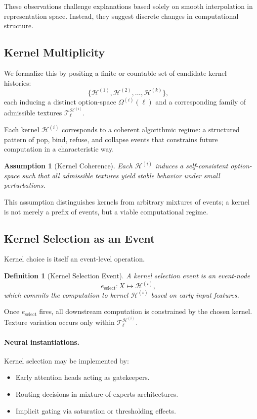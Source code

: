 \documentclass[11pt]{article}
\newtheorem{definition}{Definition}
\newtheorem{assumption}{Assumption}
\theoremstyle{remark}
\newcommand{\Hist}{\mathcal{H}}
\begin{document}
These observations challenge explanations based solely on smooth
interpolation in representation space. Instead, they suggest discrete
changes in computational structure.

\subsection{Kernel Multiplicity}

We formalize this by positing a finite or countable set of candidate
kernel histories:
\[
\{\Hist^{(1)}, \Hist^{(2)}, \ldots, \Hist^{(k)}\},
\]
each inducing a distinct option-space $\Omega^{(i)}(\ell)$ and a
corresponding family of admissible textures
$\mathcal{T}_\ell^{\Hist^{(i)}}$.

Each kernel $\Hist^{(i)}$ corresponds to a coherent algorithmic regime:
a structured pattern of pop, bind, refuse, and collapse events that
constrains future computation in a characteristic way.

\begin{assumption}[Kernel Coherence]
Each $\Hist^{(i)}$ induces a self-consistent option-space such that
all admissible textures yield stable behavior under small perturbations.
\end{assumption}

This assumption distinguishes kernels from arbitrary mixtures of
events; a kernel is not merely a prefix of events, but a viable
computational regime.

\subsection{Kernel Selection as an Event}

Kernel choice is itself an event-level operation.

\begin{definition}[Kernel Selection Event]
A kernel selection event is an event-node
\[
e_{\text{select}} : X \mapsto \Hist^{(i)},
\]
which commits the computation to kernel $\Hist^{(i)}$ based on early
input features.
\end{definition}

Once $e_{\text{select}}$ fires, all downstream computation is
constrained by the chosen kernel. Texture variation occurs only within
$\mathcal{T}_\ell^{\Hist^{(i)}}$.

\paragraph{Neural instantiations.}
Kernel selection may be implemented by:
\begin{itemize}
\item Early attention heads acting as gatekeepers.
\item Routing decisions in mixture-of-experts architectures.
\item Implicit gating via saturation or thresholding effects.
\end{itemize}
\end{document}
